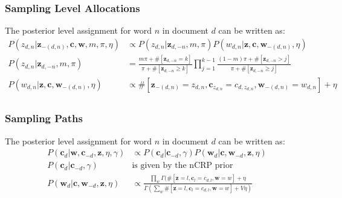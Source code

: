 \documentclass{article}
\begin{document}
\subsubsection*{Sampling Level Allocations}
The posterior level assignment for word $n$ in document $d$ can be written as:
\begin{equation}
\begin{split}
  P(z_{d,n} | \mathbf{z}_{-(d,n)}, \mathbf{c}, \mathbf{w}, m, \pi, \eta) & \propto P(z_{d,n} | \mathbf{z}_{d, -n}, m, \pi) P(w_{d,n} | \mathbf{z}, \mathbf{c}, \mathbf{w}_{-(d,n)}, \eta) \\
P(z_{d,n} | \mathbf{z}_{d, -n}, m, \pi) & = \frac{m\pi + \#[\mathbf{z}_{d, -n} = k]}{\pi + \#[\mathbf{z}_{d, -n} \geq k]} \prod_{j = 1}^{k-1} \frac{(1-m)\pi + \#[\mathbf{z}_{d, -n} > j]}{\pi + \#[\mathbf{z}_{d, -n} \geq j]} \\
  P(w_{d,n} | \mathbf{z}, \mathbf{c}, \mathbf{w}_{-(d,n)}, \eta) & \propto \#[\mathbf{z}_{-(d,n)} = z_{d,n}, \mathbf{c}_{z_{d,n}} = c_{d,z_{d,n}}, \mathbf{w}_{-(d,n)} = w_{d,n}] + 
  \eta\\
\end{split}
\end{equation}

\subsubsection*{Sampling Paths}
The posterior level assignment for word $n$ in document $d$ can be written as:
\begin{equation}
\begin{split}
  P(\mathbf{c}_d | \mathbf{w}, \mathbf{c}_{-d}, \mathbf{z}, \eta, \gamma) & \propto P(\mathbf{c}_{d} | \mathbf{c}_{-d}, \gamma) P(\mathbf{w}_{d} | \mathbf{c}, \mathbf{w}_{-d}, \mathbf{z},\eta) \\
  P(\mathbf{c}_{d} | \mathbf{c}_{-d}, \gamma)  & \text{is given by the nCRP prior} \\
  P(\mathbf{w}_{d} | \mathbf{c}, \mathbf{w}_{-d}, \mathbf{z},\eta) & \propto \frac{\prod_w \Gamma (\#[\mathbf{z} = l, \mathbf{c}_{l} = c_{d,l}, \mathbf{w} = w] + \eta}{\Gamma (\sum_w \#[\mathbf{z} = l, \mathbf{c}_{l} = c_{d,l}, \mathbf{w} = w] + V\eta)}\\
\end{split}
\end{equation}
\end{document}
